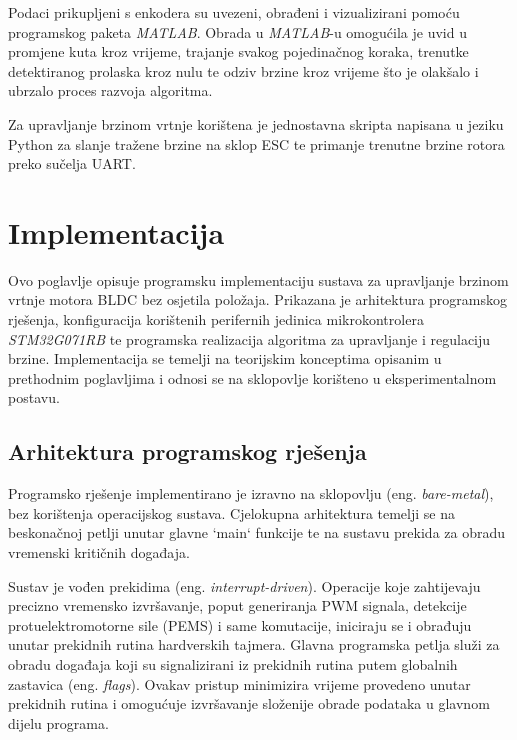 \documentclass[diplomskirad]{fer}
\begin{document}
Podaci prikupljeni s enkodera su uvezeni, obrađeni i vizualizirani pomoću
programskog paketa \textit{MATLAB}. Obrada u \textit{MATLAB}-u omogućila je
uvid u promjene kuta kroz vrijeme, trajanje svakog pojedinačnog koraka,
trenutke detektiranog prolaska kroz nulu te odziv brzine kroz vrijeme što je
olakšalo i ubrzalo proces razvoja algoritma.

Za upravljanje brzinom vrtnje korištena je jednostavna skripta napisana u
jeziku Python za slanje tražene brzine na sklop ESC te primanje trenutne brzine
rotora preko sučelja UART.

\chapter{Implementacija}
\label{pog:implementacija}

Ovo poglavlje opisuje programsku implementaciju sustava za upravljanje brzinom
vrtnje motora BLDC bez osjetila položaja. Prikazana je arhitektura programskog
rješenja, konfiguracija korištenih perifernih jedinica mikrokontrolera
\textit{STM32G071RB} te programska realizacija algoritma za upravljanje i
regulaciju brzine. Implementacija se temelji na teorijskim konceptima opisanim
u prethodnim poglavljima i odnosi se na sklopovlje korišteno u eksperimentalnom
postavu.

\section{Arhitektura programskog rješenja}
\label{sec:arhitektura_rjesenja}

Programsko rješenje implementirano je izravno na sklopovlju (eng.
\textit{bare-metal}), bez korištenja operacijskog sustava. Cjelokupna
arhitektura temelji se na beskonačnoj petlji unutar glavne `main` funkcije te
na sustavu prekida za obradu vremenski kritičnih događaja.

Sustav je vođen prekidima (eng. \textit{interrupt-driven}). Operacije koje
zahtijevaju precizno vremensko izvršavanje, poput generiranja PWM signala,
detekcije protuelektromotorne sile (PEMS) i same komutacije, iniciraju se i
obrađuju unutar prekidnih rutina hardverskih tajmera. Glavna programska petlja
služi za obradu događaja koji su signalizirani iz prekidnih rutina putem
globalnih zastavica (eng. \textit{flags}). Ovakav pristup minimizira vrijeme
provedeno unutar prekidnih rutina i omogućuje izvršavanje složenije obrade
podataka u glavnom dijelu programa.
\end{document}
